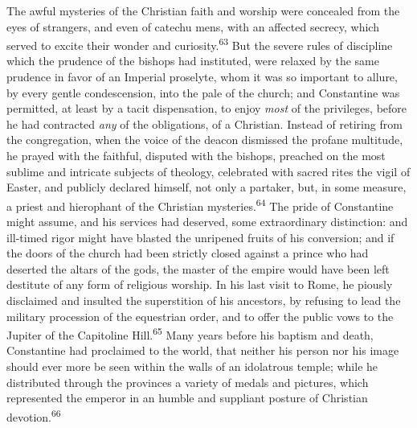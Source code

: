 The awful mysteries of the Christian faith and worship were concealed
from the eyes of strangers, and even of catechu mens, with an affected
secrecy, which served to excite their wonder and curiosity.\textsuperscript{63} But the
severe rules of discipline which the prudence of the bishops had
instituted, were relaxed by the same prudence in favor of an Imperial
proselyte, whom it was so important to allure, by every gentle
condescension, into the pale of the church; and Constantine was
permitted, at least by a tacit dispensation, to enjoy \textit{most} of the
privileges, before he had contracted \textit{any} of the obligations, of a
Christian. Instead of retiring from the congregation, when the voice of
the deacon dismissed the profane multitude, he prayed with the
faithful, disputed with the bishops, preached on the most sublime and
intricate subjects of theology, celebrated with sacred rites the vigil
of Easter, and publicly declared himself, not only a partaker, but, in
some measure, a priest and hierophant of the Christian mysteries.\textsuperscript{64}
The pride of Constantine might assume, and his services had deserved,
some extraordinary distinction: and ill-timed rigor might have blasted
the unripened fruits of his conversion; and if the doors of the church
had been strictly closed against a prince who had deserted the altars
of the gods, the master of the empire would have been left destitute of
any form of religious worship. In his last visit to Rome, he piously
disclaimed and insulted the superstition of his ancestors, by refusing
to lead the military procession of the equestrian order, and to offer
the public vows to the Jupiter of the Capitoline Hill.\textsuperscript{65} Many years
before his baptism and death, Constantine had proclaimed to the world,
that neither his person nor his image should ever more be seen within
the walls of an idolatrous temple; while he distributed through the
provinces a variety of medals and pictures, which represented the
emperor in an humble and suppliant posture of Christian devotion.\textsuperscript{66}


